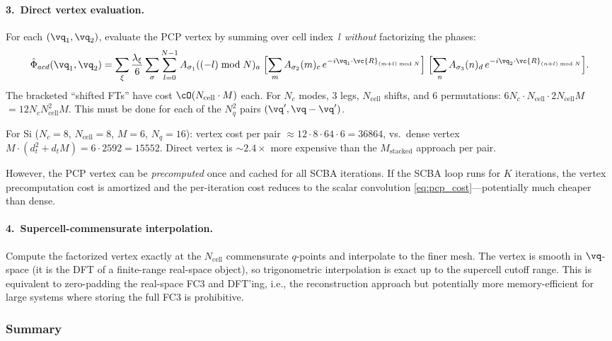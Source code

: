 \paragraph{3.\ Direct vertex evaluation.}
For each $(\vq_1, \vq_2)$, evaluate the PCP vertex by summing
over cell index~$l$ \emph{without} factorizing the phases:
\begin{equation}\label{eq:direct_vertex}
  \hat\Phi_{acd}(\vq_1,\vq_2)
  = \sum_\xi \frac{\lambda_\xi}{6} \sum_\sigma \sum_{l=0}^{N-1}
    A_{\sigma_1}((-l)\bmod N)_a\;
    \Bigl[\sum_m A_{\sigma_2}(m)_c\,
      e^{-i\vq_1\cdot\vc{R}_{(m+l)\bmod N}}\Bigr]\;
    \Bigl[\sum_n A_{\sigma_3}(n)_d\,
      e^{-i\vq_2\cdot\vc{R}_{(n+l)\bmod N}}\Bigr].
\end{equation}
The bracketed ``shifted FTs'' have cost $\cO(N_\mathrm{cell} \cdot M)$
each.  For $N_c$ modes, 3 legs, $N_\mathrm{cell}$ shifts, and
6 permutations: $6 N_c \cdot N_\mathrm{cell} \cdot 2 N_\mathrm{cell} M$
$= 12 N_c N_\mathrm{cell}^2 M$.  This must be done for each
of the $N_q^2$ pairs $(\vq', \vq-\vq')$.

For Si ($N_c = 8$, $N_\mathrm{cell} = 8$, $M = 6$, $N_q = 16$):
vertex cost per pair $\approx 12 \cdot 8 \cdot 64 \cdot 6 = 36864$,
vs.\ dense vertex $M \cdot (d_t^2 + d_t M) = 6 \cdot 2592 = 15552$.
Direct vertex is $\sim 2.4\times$ more expensive than the
$M_\mathrm{stacked}$ approach per pair.

However, the PCP vertex can be \emph{precomputed} once and
cached for all SCBA iterations.  If the SCBA loop runs for
$K$ iterations, the vertex precomputation cost is amortized
and the per-iteration cost reduces to the scalar convolution
\cref{eq:pcp_cost}---potentially much cheaper than dense.

\paragraph{4.\ Supercell-commensurate interpolation.}
Compute the factorized vertex exactly at the
$N_\mathrm{cell}$ commensurate $q$-points and interpolate to the
finer mesh.  The vertex is smooth in $\vq$-space (it is the DFT
of a finite-range real-space object), so trigonometric
interpolation is exact up to the supercell cutoff range.  This
is equivalent to zero-padding the real-space FC3 and DFT'ing,
i.e., the reconstruction approach but potentially more memory-efficient
for large systems where storing the full FC3 is prohibitive.


\subsubsection{Summary}
\label{sssub:pcp_summary}

